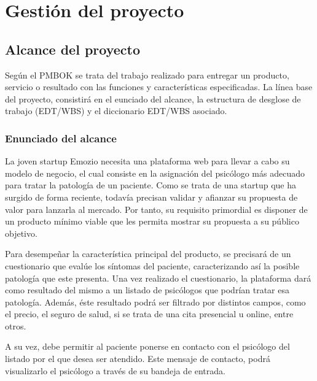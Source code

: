 \chapter{Gestión del proyecto}


\section{Alcance del proyecto}

Según el PMBOK \cite{pmbok} se trata del trabajo realizado para entregar un producto, servicio o resultado con las funciones y características especificadas. La línea base del proyecto, consistirá en el eunciado del alcance, la estructura de desglose de trabajo (EDT/WBS) y el diccionario EDT/WBS asociado.

\subsection{Enunciado del alcance}
La joven startup Emozio necesita una plataforma web para llevar a cabo su modelo de negocio, el cual consiste en la asignación del psicólogo más adecuado para tratar la patología de un paciente. 
Como se trata de una startup que ha surgido de forma reciente, todavía precisan validar y afianzar su propuesta de valor para lanzarla al mercado. Por tanto, su requisito primordial es disponer de un producto mínimo viable que les permita mostrar su propuesta a su público objetivo.


Para desempeñar la característica principal del producto, se precisará de un cuestionario que evalúe los síntomas del paciente, caracterizando así la posible patología que este presenta. Una vez realizado el cuestionario, la plataforma dará como resultado del mismo a un listado de psicólogos que podrían tratar esa patología. Además, éste resultado podrá ser filtrado por distintos campos, como el precio, el seguro de salud, si se trata de una cita presencial u online, entre otros. 


A su vez, debe permitir al paciente ponerse en contacto con el psicólogo del listado por el que desea ser atendido. Este mensaje de contacto, podrá visualizarlo el psicólogo a través de su bandeja de entrada. 


